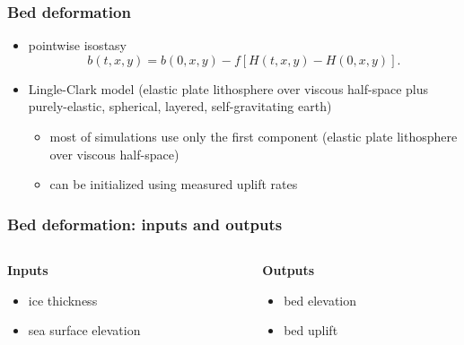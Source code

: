 \documentclass[hide notes,intlimits]{beamer}
\begin{document}
\begin{frame}
  \frametitle{Bed deformation}

  \begin{itemize}
  \item pointwise isostasy
    \begin{equation}
      \label{eq:9}
      b(t,x,y) = b(0,x,y) - f \left[H(t,x,y) - H(0,x,y)\right].
    \end{equation}
  \item Lingle-Clark model (elastic plate lithosphere over viscous
    half-space plus purely-elastic, spherical, layered,
    self-gravitating earth)

    \begin{itemize}
    \item most of simulations use only the first component (elastic
      plate lithosphere over viscous half-space)
    \item can be initialized using measured uplift rates
    \end{itemize}
  \end{itemize}
\end{frame}

\begin{frame}
  \frametitle{Bed deformation: inputs and outputs}

  \begin{columns}[t]
    \begin{column}{0.5\linewidth}
      \textbf{Inputs}

      \begin{itemize}
      \item ice thickness
      \item sea surface elevation
      \end{itemize}
    \end{column}
    \begin{column}{0.5\linewidth}
      \textbf{Outputs}

      \begin{itemize}
      \item bed elevation
      \item bed uplift
      \end{itemize}
    \end{column}
  \end{columns}
\end{frame}
\end{document}
